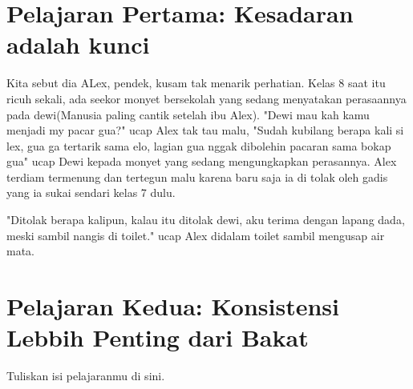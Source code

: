 \documentclass[12pt,oneside]{book}
\begin{document}
	\setcounter{page}{1}
	\pagestyle{fancy}
	
	\chapter{Pelajaran Pertama: Kesadaran adalah kunci}
	Kita sebut dia ALex, pendek, kusam tak menarik perhatian. Kelas 8 saat itu ricuh sekali, ada seekor monyet bersekolah yang sedang menyatakan perasaannya pada dewi(Manusia paling cantik setelah ibu Alex). "Dewi mau kah kamu menjadi my pacar gua?" ucap Alex tak tau malu, "Sudah kubilang berapa kali si lex, gua ga tertarik sama elo, lagian gua nggak dibolehin pacaran sama bokap gua" ucap Dewi kepada monyet yang sedang mengungkapkan perasannya. Alex terdiam termenung dan tertegun malu karena baru saja ia di tolak oleh gadis yang ia sukai sendari kelas 7 dulu.
	
	"Ditolak berapa kalipun, kalau itu ditolak dewi, aku terima dengan lapang dada, meski sambil nangis di toilet." ucap Alex didalam toilet sambil mengusap air mata.
	
	\cleardoublepage
	
	\chapter{Pelajaran Kedua: Konsistensi Lebbih Penting dari Bakat}
	
	Tuliskan isi pelajaranmu di sini.
	
\end{document}
